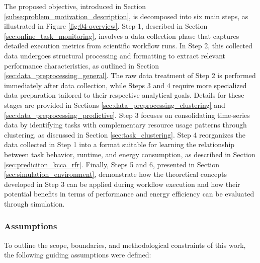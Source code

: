 The proposed objective, introduced in Section \ref{subse:problem_motivation_description}, is decomposed into six main steps, as illustrated in Figure \ref{fig:04-overview}. Step 1, described in Section \ref{sec:online_task_monitoring}, involves a data collection phase that captures detailed execution metrics from scientific workflow runs. In Step 2, this collected data undergoes structural processing and formatting to extract relevant performance characteristics, as outlined in Section \ref{sec:data_preprocessing_general}. The raw data treatment of Step 2 is performed immediately after data collection, while Steps 3 and 4 require more specialized data preparation tailored to their respective analytical goals. Details for these stages are provided in Sections \ref{sec:data_preprocessing_clustering} and \ref{sec:data_preprocessing_predictive}.
Step 3 focuses on consolidating time-series data by identifying tasks with complementary resource usage patterns through clustering, as discussed in Section \ref{sec:task_clustering}. Step 4 reorganizes the data collected in Step 1 into a format suitable for learning the relationship between task behavior, runtime, and energy consumption, as described in Section \ref{sec:prediciton_kcca_rfr}. Finally, Steps 5 and 6, presented in Section \ref{sec:simulation_environment}, demonstrate how the theoretical concepts developed in Step 3 can be applied during workflow execution and how their potential benefits in terms of performance and energy efficiency can be evaluated through simulation.

\subsubsection{Assumptions}
\label{sec:assumptions}

To outline the scope, boundaries, and methodological constraints of this work, the following guiding assumptions were defined:

